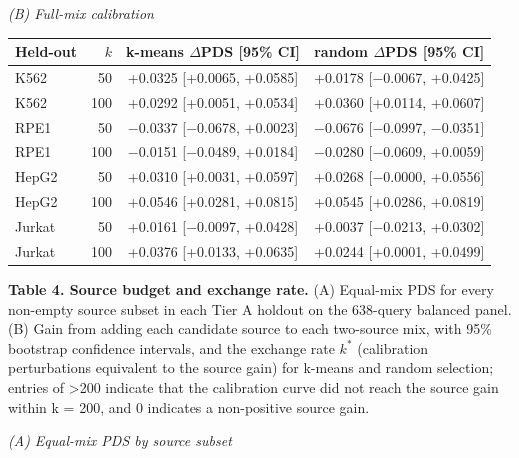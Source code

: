\documentclass[12pt]{article}
\begin{document}
\begin{singlespace}
\noindent\textit{(B) Full-mix calibration}

{\footnotesize
\setlength{\tabcolsep}{4pt}
\renewcommand{\arraystretch}{1.0}
\begin{tabular}{@{}lrcc@{}}
\toprule
Held-out & $k$ & \makecell{k-means $\Delta$PDS\\{[95\% CI]}} & \makecell{random $\Delta$PDS\\{[95\% CI]}} \\
\midrule
K562 & 50 & +0.0325 [+0.0065, +0.0585] & +0.0178 [$-$0.0067, +0.0425] \\
K562 & 100 & +0.0292 [+0.0051, +0.0534] & +0.0360 [+0.0114, +0.0607] \\
RPE1 & 50 & $-$0.0337 [$-$0.0678, +0.0023] & $-$0.0676 [$-$0.0997, $-$0.0351] \\
RPE1 & 100 & $-$0.0151 [$-$0.0489, +0.0184] & $-$0.0280 [$-$0.0609, +0.0059] \\
HepG2 & 50 & +0.0310 [+0.0031, +0.0597] & +0.0268 [$-$0.0000, +0.0556] \\
HepG2 & 100 & +0.0546 [+0.0281, +0.0815] & +0.0545 [+0.0286, +0.0819] \\
Jurkat & 50 & +0.0161 [$-$0.0097, +0.0428] & +0.0037 [$-$0.0213, +0.0302] \\
Jurkat & 100 & +0.0376 [+0.0133, +0.0635] & +0.0244 [+0.0001, +0.0499] \\
\bottomrule
\end{tabular}
}

\clearpage

\noindent\textbf{Table 4. Source budget and exchange rate.} (A) Equal-mix PDS for every non-empty source subset in each Tier A holdout on the 638-query balanced panel. (B) Gain from adding each candidate source to each two-source mix, with 95\% bootstrap confidence intervals, and the exchange rate $k^*$ (calibration perturbations equivalent to the source gain) for k-means and random selection; entries of >200 indicate that the calibration curve did not reach the source gain within k = 200, and 0 indicates a non-positive source gain.

\vspace{6pt}
\noindent\textit{(A) Equal-mix PDS by source subset}


\end{singlespace}
\end{document}
